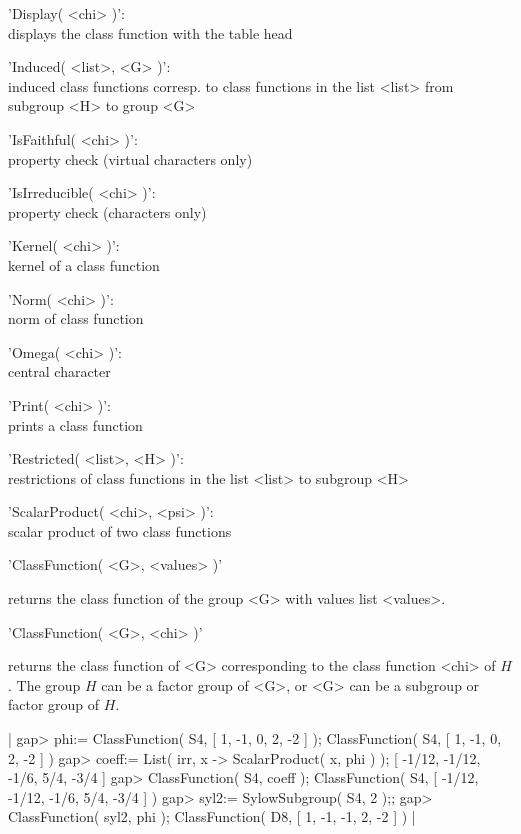 'Display( <chi> )': \\ displays the class function with the table head

'Induced( <list>, <G> )': \\ induced class functions corresp. to
              class functions in the list <list> from subgroup <H> to
              group <G>

'IsFaithful( <chi> )': \\ property check (virtual characters only)

'IsIrreducible( <chi> )': \\ property check (characters only)

'Kernel( <chi> )': \\ kernel of a class function

'Norm( <chi> )': \\ norm of class function

'Omega( <chi> )': \\ central character

'Print( <chi> )': \\ prints a class function

'Restricted( <list>, <H> )': \\ restrictions of class functions in
              the list <list> to subgroup <H>

'ScalarProduct( <chi>, <psi> )': \\ scalar product of two class functions

% 


'ClassFunction( <G>, <values> )'

returns the class function of the group <G> with values list <values>.

'ClassFunction( <G>, <chi> )'

returns the class function of <G> corresponding to the class function
<chi> of $H$.  The group $H$ can be a factor group of <G>, or <G> can be
a subgroup or factor group of $H$.

|    gap> phi:= ClassFunction( S4, [ 1, -1, 0, 2, -2 ] );
    ClassFunction( S4, [ 1, -1, 0, 2, -2 ] )
    gap> coeff:= List( irr, x -> ScalarProduct( x, phi ) );
    [ -1/12, -1/12, -1/6, 5/4, -3/4 ]
    gap> ClassFunction( S4, coeff );
    ClassFunction( S4, [ -1/12, -1/12, -1/6, 5/4, -3/4 ] )
    gap> syl2:= SylowSubgroup( S4, 2 );;
    gap> ClassFunction( syl2, phi );
    ClassFunction( D8, [ 1, -1, -1, 2, -2 ] ) |

